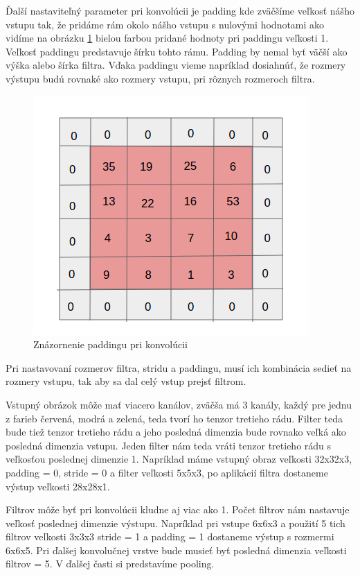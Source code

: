 Ďalší nastaviteľný parameter pri konvolúcii je padding kde zväčšíme veľkosť nášho vstupu tak, že pridáme rám okolo nášho vstupu s nulovými hodnotami ako vidíme na obrázku \ref{fig:image302} bielou farbou pridané hodnoty pri paddingu veľkosti 1. Veľkosť paddingu predstavuje šírku tohto rámu. Padding by nemal byť väčší ako výška alebo šírka filtra. Vďaka paddingu vieme napríklad dosiahnúť, že rozmery výstupu budú rovnaké ako rozmery vstupu, pri rôznych rozmeroch filtra.

\begin{figure}[H]
\includegraphics{images/padding.png}
\centering
\caption{Znázornenie paddingu pri konvolúcii}
\label{fig:image302}
\end{figure}

Pri nastavovaní rozmerov filtra, stridu a paddingu, musí ich kombinácia sedieť na rozmery vstupu, tak aby sa dal celý vstup prejsť filtrom.

Vstupný obrázok môže mať viacero kanálov, zväčša má 3 kanály, každý pre jednu z farieb červená, modrá a zelená, teda tvorí ho tenzor tretieho rádu. Filter teda bude tiež tenzor tretieho rádu a jeho posledná dimenzia bude rovnako veľká ako posledná dimenzia vstupu. Jeden filter nám teda vráti tenzor tretieho rádu s veľkosťou poslednej dimenzie 1. Napríklad máme vstupný obraz veľkosti 32x32x3, padding = 0, stride = 0 a filter veľkosti 5x5x3, po aplikácií filtra dostaneme výstup veľkosti 28x28x1. 

Filtrov môže byť pri konvolúcii kludne aj viac ako 1. Počet filtrov nám nastavuje veľkosť poslednej dimenzie výstupu. Napríklad pri vstupe 6x6x3 a použití 5 tich filtrov veľkosti 3x3x3 stride = 1 a padding = 1 dostaneme výstup s rozmermi 6x6x5. Pri ďalšej konvolučnej vrstve bude musieť byť posledná dimenzia veľkosti filtrov = 5. V ďalšej časti si predstavíme pooling. 



